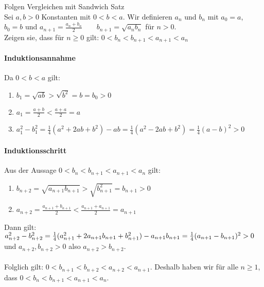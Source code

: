 \begin{example2}{Folgen Vergleichen mit Sandwich Satz}\\

	Sei $a,b >0$ Konstanten mit $0 < b < a$. Wir definieren $a_n$ und $b_n$  mit $a_0 = a$, $b_0 = b$ und
    $a_{n+1} = \frac{a_n + b_n}{2} \qquad b_{n+1} = \sqrt{a_n b_n}$
	für $n > 0$.\\
	Zeigen sie, dass für $n \geq 0$ gilt: $0 < b_n < b_{n+1} < a_{n+1} < a_n$
	\paragraph{Induktionsannahme}%
	\label{par:ia}
	Da $0 < b < a$ gilt:
	\begin{enumerate}
		\item $b_1 = \sqrt{ab} > \sqrt{b^2} = b = b_0 > 0$
		\item $a_1 = \frac{a + b}{2} < \frac{a + a}{2} = a$
		\item $a_1^2 - b_1^2 = \frac{1}{4} \left( a^2 + 2ab + b^2 \right) - ab = \frac{1}{4} (a^2 -2ab + b^2) = \frac{1}{4} (a -b)^2 > 0$
	\end{enumerate}
	\paragraph{Induktionsschritt}%
	\label{par:is}
	Aus der Aussage $0 < b_n < b_{n+1} < a_{n+1} < a_n$ gilt:
	\begin{enumerate}
		\item $b_{n+2} = \sqrt{a_{n+1} b_{n+1}} > \sqrt{b_{n+1}^2} = b_{n+1} > 0$
		\item $a_{n+2} = \frac{a_{n+1} + b_{n+1}}{2} < \frac{a_{n+1} + a_{n+1}}{2} = a_{n+1}$
	\end{enumerate}
    \vspace{1mm}
	Dann gilt: $a_{n+2}^2 - b_{n+2}^2 = \frac{1}{4} ( a_{n+1}^2 + 2a_{n+1}b_{n+1} + b_{n+1}^2) - a_{n+1} b_{n+1}\\
				      = \frac{1}{4} ( a_{n+1} - b_{n+1})^2 > 0$
	und $a_{n+2}, b_{n+2} > 0$ also $a_{n+2} > b_{n+2}$.\\ \\
	Folglich gilt: $0 < b_{n+1} < b_{n+2} < a_{n+2} < a_{n+1}$. 
	Deshalb haben wir für alle $n \geq 1$, dass $0 < b_n < b_{n+1} < a_{n+1} < a_n$.
\end{example2}